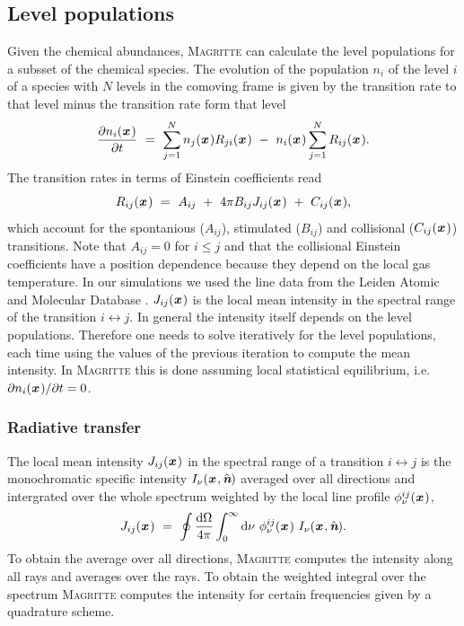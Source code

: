 \documentclass[a4paper,fleqn,usenatbib]{mnras}
\newcommand{\D}{\text{d}}
\newcommand{\x}{{\textit{\textbf{x}}}\,}
\newcommand{\n}{\hat{\textit{\textbf{n}}}}
\begin{document}
\subsection{Level populations}
Given the chemical abundances, \textsc{Magritte} can calculate the level populations for a subsset of the chemical species. The evolution of the population $n_{i}$ of the level $i$ of a species with $N$ levels in the comoving frame is given by the transition rate to that level minus the transition rate form that level
\begin{equation}
	\frac{\partial n_{i}(\x)}{\partial t} \ = \
	\sum_{j=1}^{N} n_{j}(\x) R_{ji}(\x) \ - \ n_{i}(\x) \sum_{j=1}^{N} R_{ij}(\x) .
\label{levelpop}
\end{equation}
The transition rates in terms of Einstein coefficients read
\begin{equation}
	R_{ij}(\x) \ = \ A_{ij} \ + \ 4\pi B_{ij}  J_{ij}(\x) \ + \ C_{ij}(\x),
\end{equation}
which account for the spontanious ($A_{ij}$), stimulated ($B_{ij}$) and collisional ($C_{ij}(\x)$) transitions. Note that $A_{ij}=0$ for $i \leq j$ and that the collisional Einstein coefficients have a position dependence because they depend on the local gas temperature. In our simulations we used the line data from the Leiden Atomic and Molecular Database \citep[LAMDA,][]{Schoier2005}. $J_{ij}(\x)$ is the local mean intensity in the spectral range of the transition $i \leftrightarrow j$. In general the intensity itself depends on the level populations. Therefore one needs to solve iteratively for the level populations, each time using the values of the previous iteration to compute the mean intensity. In \textsc{Magritte} this is done assuming local statistical equilibrium, i.e. $\partial n_{i}(\x)/\partial t = 0$.



\subsubsection{Radiative transfer}

The local mean intensity $J_{ij}(\x)$ in the spectral range of a transition $i \leftrightarrow j$ is the monochromatic specific intensity $I_{\nu}(\x, \n)$ averaged over all directions and intergrated over the whole spectrum weighted by the local line profile $\phi_{\nu}^{ij}(\x)$,
\begin{equation}
	J_{ij}(\x) \ = \ \oint \frac{\D\Omega}{4\pi} \int_{0}^{\infty} \D\nu \ \phi_{\nu}^{ij}(\x) \ I_{\nu}(\x, \n).
\end{equation}
To obtain the average over all directions, \textsc{Magritte} computes the intensity along all rays and averages over the rays. To obtain the weighted integral over the spectrum \textsc{Magritte} computes the intensity for certain frequencies given by a quadrature scheme.
\end{document}

